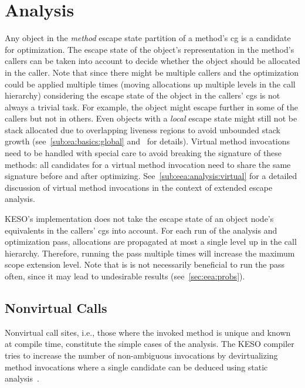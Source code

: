 	\section{Analysis}
		\label{sec:eea:analysis}
		Any object in the \emph{method} escape state partition of a method's \gls{cg} is a candidate for optimization. The
		escape state of the object's representation in the method's callers can be taken into account to decide whether the
		object should be allocated in the caller. Note that since there might be multiple callers and the optimization could
		be applied multiple times (moving allocations up multiple levels in the call hierarchy) considering the escape state
		of the object in the callers' \glspl{cg} is not always a trivial task. For example, the object might escape further
		in some of the callers but not in others. Even objects with a \emph{local} escape state might still not be stack
		allocated due to overlapping liveness regions to avoid unbounded stack growth (see~\cref{sub:ea:basics:global}
		and~\cite[Sec.~3.3]{lang:12} for details). Virtual method invocations need to be handled with special care to avoid
		breaking the signature of these methods: all candidates for a virtual method invocation need to share the same
		signature before and after optimizing. See~\cref{sub:eea:analysis:virtual} for a detailed discussion of virtual
		method invocations in the context of extended escape analysis.

		KESO's implementation does not take the escape state of an object node's equivalents in the callers' \glspl{cg} into
		account. For each run of the analysis and optimization pass, allocations are propagated at most a single level up in
		the call hierarchy. Therefore, running the pass multiple times will increase the maximum scope extension level. Note
		that is is not necessarily beneficial to run the pass often, since it may lead to undesirable results
		(see~\cref{sec:eea:probs}).

		\subsection{Nonvirtual Calls}
			\label{sub:eea:analysis:nonvirtual}
			Nonvirtual call sites, i.e., those where the invoked method is unique and known at compile time, constitute the
			simple cases of the analysis. The KESO compiler tries to increase the number of non-ambiguous invocations by
			devirtualizing method invocations where a single candidate can be deduced using static
			analysis~\cite[Sec.~3.4]{erhardt:11:jtres}.

